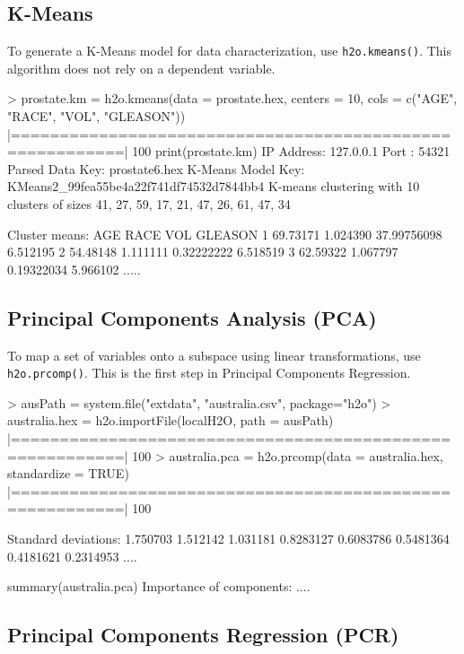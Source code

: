 \documentclass[11pt]{article}
\begin{document}
\begin{enumerate}
\subsection{K-Means}

To generate a K-Means model for data characterization, use {\texttt{h2o.kmeans()}}. This algorithm does not rely on a dependent variable. 
\begin{spverbatim}


> prostate.km = h2o.kmeans(data = prostate.hex, centers = 10,
cols = c("AGE", "RACE", "VOL", "GLEASON"))
  |=========================================================| 100%
print(prostate.km)
IP Address: 127.0.0.1
Port      : 54321
Parsed Data Key: prostate6.hex
K-Means Model Key: KMeans2_99fea55be4a22f741df74532d7844bb4
K-means clustering with 10 clusters of sizes 41, 27, 59, 17, 21, 47, 26, 61, 47, 34

      Cluster means:
      AGE     RACE         VOL  GLEASON
      1  69.73171 1.024390 37.99756098 6.512195
      2  54.48148 1.111111  0.32222222 6.518519
      3  62.59322 1.067797  0.19322034 5.966102
      .....
\end{spverbatim}

\subsection{Principal Components Analysis (PCA)}

To map a set of variables onto a subspace using linear transformations, use {\texttt{h2o.prcomp()}}. This is the first step in Principal Components Regression. 
\begin{spverbatim}


> ausPath = system.file("extdata", "australia.csv", package="h2o")
> australia.hex = h2o.importFile(localH2O, path = ausPath)
  |=========================================================| 100%
> australia.pca = h2o.prcomp(data = australia.hex, standardize = TRUE)
  |=========================================================| 100%

 Standard deviations:
 1.750703 1.512142 1.031181 0.8283127 0.6083786 0.5481364 0.4181621 0.2314953
      ....

summary(australia.pca)
Importance of components:
....
\end{spverbatim}

\subsection{Principal Components Regression (PCR)}


\end{enumerate}
\end{document}
